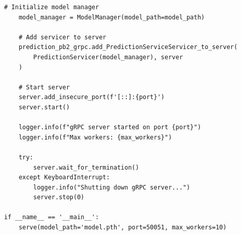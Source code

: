 \begin{lstlisting}[style=python, caption=gRPC server implementation]
    # Initialize model manager
    model_manager = ModelManager(model_path=model_path)

    # Add servicer to server
    prediction_pb2_grpc.add_PredictionServiceServicer_to_server(
        PredictionServicer(model_manager), server
    )

    # Start server
    server.add_insecure_port(f'[::]:{port}')
    server.start()

    logger.info(f"gRPC server started on port {port}")
    logger.info(f"Max workers: {max_workers}")

    try:
        server.wait_for_termination()
    except KeyboardInterrupt:
        logger.info("Shutting down gRPC server...")
        server.stop(0)

if __name__ == '__main__':
    serve(model_path='model.pth', port=50051, max_workers=10)
\end{lstlisting}

